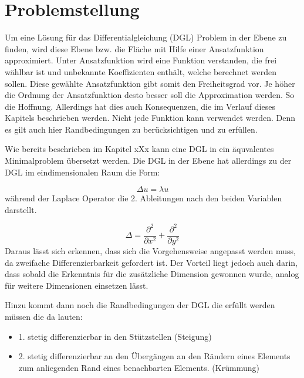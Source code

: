 %
%
%
\section{Problemstellung
\label{fem:section:problemstellung}}

Um eine Lösung für das Differentialgleichung (DGL) Problem in der Ebene zu finden, wird diese Ebene bzw. die Fläche mit Hilfe einer Ansatzfunktion approximiert. Unter Ansatzfunktion wird eine Funktion verstanden, die frei wählbar ist und unbekannte Koeffizienten enthält, welche berechnet werden sollen. Diese gewählte Ansatzfunktion gibt somit den Freiheitsgrad vor. Je höher die Ordnung der Ansatzfunktion desto besser soll die Approximation werden. So die Hoffnung. Allerdings hat dies auch Konsequenzen, die im Verlauf dieses Kapitels beschrieben werden. Nicht jede Funktion kann verwendet werden. Denn es  gilt auch hier Randbedingungen zu berücksichtigen und zu erfüllen. 

Wie bereits beschrieben im Kapitel xXx kann eine DGL in ein äquvalentes Minimalproblem übersetzt werden. Die DGL in der Ebene hat allerdings zu der DGL im eindimensionalen Raum die Form:

\begin{equation}
	\Delta u = \lambda u
	\label{fem:DGL2D}
\end{equation} 
während der Laplace Operator die 2. Ableitungen nach den beiden Variablen darstellt.

\begin{equation}
	\Delta = \frac{\partial ^2}{\partial x^2} + \frac{\partial ^2}{\partial y^2}
\end{equation} 
Daraus lässt sich erkennen, dass sich die Vorgehensweise angepasst werden muss, da zweifache Differenzierbarkeit gefordert ist. Der Vorteil liegt jedoch auch darin, dass sobald die Erkenntnis für die zusätzliche Dimension gewonnen wurde, analog für weitere Dimensionen einsetzen lässt.

Hinzu kommt dann noch die Randbedingungen der DGL die erfüllt werden müssen die da lauten:
\begin{itemize}
	\item 1. stetig differenzierbar in den Stützstellen (Steigung)
	\item 2. stetig differenzierbar an den Übergängen an den Rändern eines Elements zum anliegenden Rand eines benachbarten Elements. (Krümmung)
\end{itemize}

